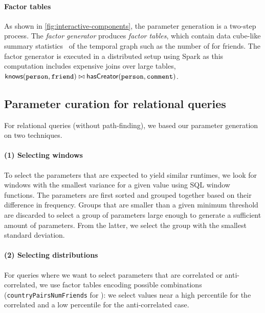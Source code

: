 \paragraph{Factor tables}
As shown in \autoref{fig:interactive-components}, the parameter generation is a two-step process.
The \emph{factor generator} produces \emph{factor tables}, which contain data cube-like summary statistics~\cite{DBLP:journals/datamine/GrayCBLRVPP97} of the temporal graph such as the number of \Messages for friends.
The factor generator is executed in a distributed setup using Spark as this computation includes expensive joins over large tables,
\eg $\textsf{knows}(\texttt{person}, \texttt{friend}) \bowtie \textsf{hasCreator}(\texttt{person}, \texttt{comment})$.


\subsection{Parameter curation for relational queries}

For relational queries (without path-finding), we based our parameter generation on two techniques.

\paragraph{(1) Selecting windows}
%
To select the parameters that are expected to yield similar runtimes, we look for windows with the smallest variance for a given value using SQL window functions.
The parameters are first sorted and grouped together based on their difference in frequency.
Groups that are smaller than a given minimum threshold are discarded to select a group of
parameters large enough to generate a sufficient amount of parameters.
From the latter, we select
the group with the smallest standard deviation.

\paragraph{(2) Selecting distributions}
%
For queries where we want to select parameters that are correlated or anti-correlated, we use factor tables encoding possible combinations (\eg \texttt{countryPairsNumFriends} for \CR[3]):
we select values near a high percentile for the correlated and a low percentile for the anti-correlated case.

